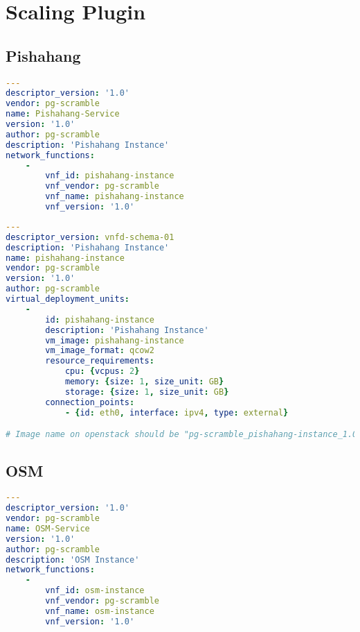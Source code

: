 \newpage
\section{Scaling Plugin}
\subsection{Pishahang}

\begin{lstlisting}[language=yaml,caption=Pishahang MANO instance NSD,label=pishmanonsd]
---
descriptor_version: '1.0'
vendor: pg-scramble
name: Pishahang-Service
version: '1.0'
author: pg-scramble
description: 'Pishahang Instance'
network_functions:
    -
        vnf_id: pishahang-instance
        vnf_vendor: pg-scramble
        vnf_name: pishahang-instance
        vnf_version: '1.0'

\end{lstlisting}

\begin{lstlisting}[language=yaml,caption=Pishahang MANO instance VNFD,label=pishmanovnfd]
---
descriptor_version: vnfd-schema-01
description: 'Pishahang Instance'
name: pishahang-instance
vendor: pg-scramble
version: '1.0'
author: pg-scramble
virtual_deployment_units:
    -
        id: pishahang-instance
        description: 'Pishahang Instance'
        vm_image: pishahang-instance
        vm_image_format: qcow2
        resource_requirements:
            cpu: {vcpus: 2}
            memory: {size: 1, size_unit: GB}
            storage: {size: 1, size_unit: GB}
        connection_points:
            - {id: eth0, interface: ipv4, type: external}

# Image name on openstack should be "pg-scramble_pishahang-instance_1.0_pishahang-instance"


\end{lstlisting}

\subsection{OSM}

\begin{lstlisting}[language=yaml,caption=OSM MANO instance NSD,label=osmmanonsd]
---
descriptor_version: '1.0'
vendor: pg-scramble
name: OSM-Service
version: '1.0'
author: pg-scramble
description: 'OSM Instance'
network_functions:
    -
        vnf_id: osm-instance
        vnf_vendor: pg-scramble
        vnf_name: osm-instance
        vnf_version: '1.0'

\end{lstlisting}


